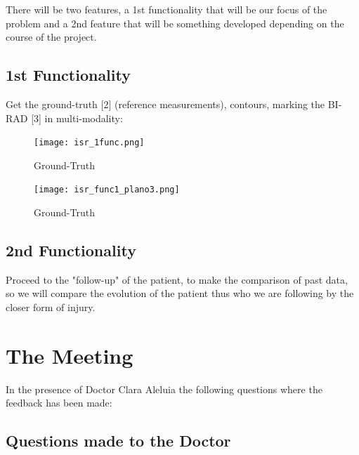 There will be two features, a 1st functionality that will be our focus of the problem and a 2nd feature that will be something developed depending on the course of the project.

\subsection{1st Functionality}

Get the ground-truth [2] (reference measurements), contours, marking the BI-RAD [3] in multi-modality:

\begin{figure}[!hbt]
\centering
\texttt{[image: isr\_1func.png]}
\caption{\label{fig:frog}Ground-Truth}
\end{figure}

\begin{figure}[!hbt]
\centering
\texttt{[image: isr\_func1\_plano3.png]}
\caption{\label{fig:frog}Ground-Truth}
\end{figure}

\subsection{2nd Functionality}

Proceed to the "follow-up" of the patient, to make the comparison of past data, so we will compare the evolution of the patient thus who we are following by the closer form of injury.

\section{The Meeting}
\label{sec:examples}

In the presence of Doctor Clara Aleluia the following questions where the feedback has been made:

\subsection{Questions made to the Doctor}

